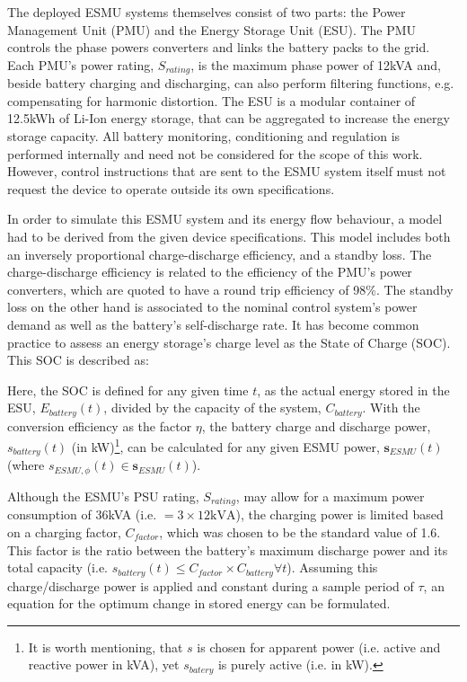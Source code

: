 The deployed ESMU systems themselves consist of two parts: the Power Management Unit (PMU) and the Energy Storage Unit (ESU).
The PMU controls the phase powers converters and links the battery packs to the grid.
Each PMU's power rating, $S_{rating}$, is the maximum phase power of 12kVA and, beside battery charging and discharging, can also perform filtering functions, e.g. compensating for  harmonic distortion.
The ESU is a modular container of 12.5kWh of Li-Ion energy storage, that can be aggregated to increase the energy storage capacity.
All battery monitoring, conditioning and regulation is performed internally and need not be considered for the scope of this work.
However, control instructions that are sent to the ESMU system itself must not request the device to operate outside its own specifications.

In order to simulate this ESMU system and its energy flow behaviour, a model had to be derived from the given device specifications.
This model includes both an inversely proportional charge-discharge efficiency, and a standby loss.
The charge-discharge efficiency is related to the efficiency of the PMU's power converters, which are quoted to have a round trip efficiency of 98\%.
The standby loss on the other hand is associated to the nominal control system's power demand as well as the battery's self-discharge rate.
It has become common practice to assess an energy storage's charge level as the State of Charge (SOC).
This SOC is described as:



Here, the SOC is defined for any given time $t$, as the actual energy stored in the ESU, $E_{battery}(t)$, divided by the capacity of the system, $C_{battery}$.
With the conversion efficiency as the factor $\eta$, the battery charge and discharge power, $s_{battery}(t)$ (in kW)\footnote[1]{It is worth mentioning, that $s$ is chosen for apparent power (i.e. active and reactive power in kVA), yet $s_{batery}$ is purely active (i.e. in kW).}, can be calculated for any given ESMU power, $\textbf{s}_{ESMU}(t)$ (where $s_{ESMU,\phi}(t) \in \textbf{s}_{ESMU}(t)$).



Although the ESMU's PSU rating, $S_{rating}$, may allow for a maximum power consumption of 36kVA (i.e. $=3\times12\text{kVA}$), the charging power is limited based on a charging factor, $C_{factor}$, which was chosen to be the standard value of 1.6.
This factor is the ratio between the battery's maximum discharge power and its total capacity (i.e. $s_{battery}(t) \leq C_{factor}\times C_{battery} \forall t$).
Assuming this charge/discharge power is applied and constant during a sample period of $\tau$, an equation for the optimum change in stored energy can be formulated.


